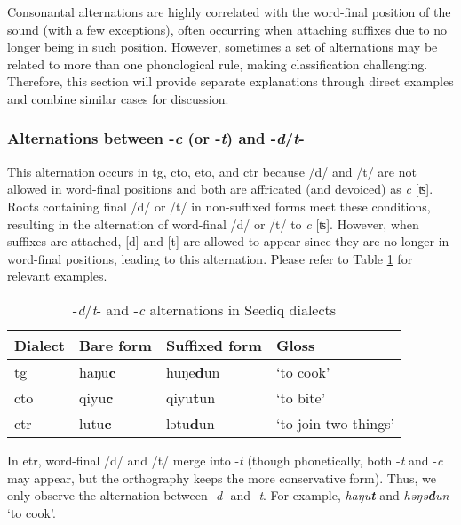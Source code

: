Consonantal alternations are highly correlated with the word-final position of the sound (with a few exceptions), often occurring when attaching suffixes due to no longer being in such position. However, sometimes a set of alternations may be related to more than one phonological rule, making classification challenging. Therefore, this section will provide separate explanations through direct examples and combine similar cases for discussion.

\subsubsection{Alternations between -\textit{c} (or -\textit{t}) and -\textit{d}/\textit{t}-} \label{sec:dtc_alt}

This alternation occurs in \acl{tg}, \acl{cto}, \acl{eto}, and \acl{ctr} because /d/ and /t/ are not allowed in word-final positions and both are affricated (and devoiced) as \textit{c} [ʦ]. Roots containing final /d/ or /t/ in non-suffixed forms meet these conditions, resulting in the alternation of word-final /d/ or /t/ to \textit{c} [ʦ]. However, when suffixes are attached, [d] and [t] are allowed to appear since they are no longer in word-final positions, leading to this alternation. Please refer to Table \ref{tab:dtc_alt} for relevant examples.

\begin{table}[!htbp]
\centering
\caption{-\textit{d}/\textit{t}- and -\textit{c} alternations in Seediq dialects}
\label{tab:dtc_alt}
\begin{tabular}{llll}
\hline
Dialect   & Bare form & Suffixed form & Gloss                \\ \hline
\acl{tg}  & haŋu\textbf{c}     & huŋe\textbf{d}un       & `to cook'            \\
\acl{cto} & qiyu\textbf{c}     & qiyu\textbf{t}un       & `to bite'            \\
\acl{ctr} & lutu\textbf{c}     & lətu\textbf{d}un       & `to join two things' \\ \hline
\end{tabular}
\end{table}

In \acl{etr}, word-final /d/ and /t/ merge into -\textit{t} (though phonetically, both -\textit{t} and -\textit{c} may appear, but the orthography keeps the more conservative form). Thus, we only observe the alternation between -\textit{d}- and -\textit{t}. For example, \textit{haŋu\textbf{t}} and \textit{həŋə\textbf{d}un} `to cook'.

